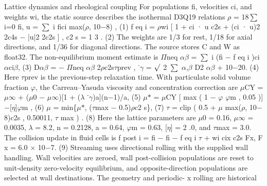 \documentclass[11pt]{article}
\begin{document}
Lattice dynamics and rheological coupling
For populations fi, velocities ci, and weights wi, the static source describes the isothermal D3Q19
relations
\ensuremath{\rho} =
18\ensuremath{\sum}
i=0
fi, u =
\ensuremath{\sum}
i fici
max(\ensuremath{\rho}, 10\ensuremath{-}8) , (1)
f eq
i = \ensuremath{\rho}wi
[
1 + ci · u
c2s
+ (ci · u)2
2c4s
\ensuremath{-} |u|2
2c2s
]
, c2
s = 1
3 . (2)
The weights are 1/3 for rest, 1/18 for axial directions, and 1/36 for diagonal directions. The source
stores C and W as float32. The non-equilibrium moment estimate is
\ensuremath{\Pi}neq
\ensuremath{\alpha}\ensuremath{\beta} =
\ensuremath{\sum}
i
(fi \ensuremath{-} f eq
i )ci\ensuremath{\alpha}ci\ensuremath{\beta}, (3)
D\ensuremath{\alpha}\ensuremath{\beta} = \ensuremath{-}
\ensuremath{\Pi}neq
\ensuremath{\alpha}\ensuremath{\beta}
2\ensuremath{\rho}c2s\ensuremath{\tau}prev
, ˙\ensuremath{\gamma} =
\ensuremath{\surd}
2
\ensuremath{\sum}
\ensuremath{\alpha},\ensuremath{\beta}
D2
\ensuremath{\alpha}\ensuremath{\beta} + 10\ensuremath{-}20. (4)
Here \ensuremath{\tau}prev is the previous-step relaxation time. With particulate solid volume fraction \ensuremath{\varphi}, the
Carreau–Yasuda viscosity and concentration correction are
\ensuremath{\mu}CY = \ensuremath{\mu}\ensuremath{\infty} + (\ensuremath{\mu}0 \ensuremath{-} \ensuremath{\mu}\ensuremath{\infty})[1 + (\ensuremath{\lambda} ˙\ensuremath{\gamma})a](n\ensuremath{-}1)/a, (5)
\ensuremath{\mu}\ensuremath{\ast} = \ensuremath{\mu}CY
[
max
(
1 \ensuremath{-} \ensuremath{\varphi}
\ensuremath{\varphi}m
, 0.05
)] \ensuremath{-}[\ensuremath{\eta}]\ensuremath{\varphi}m
, (6)
\ensuremath{\mu} = min\{\ensuremath{\mu}\ensuremath{\ast}, (\ensuremath{\tau}max \ensuremath{-} 0.5)\ensuremath{\rho}c2
s\}, (7)
\ensuremath{\tau} = clip
(
0.5 + \ensuremath{\mu}
max(\ensuremath{\rho}, 10\ensuremath{-}8)c2s
, 0.50011, \ensuremath{\tau} max
)
. (8)
Here the lattice parameters are \ensuremath{\mu}0 = 0.16, \ensuremath{\mu}\ensuremath{\infty} = 0.0035, \ensuremath{\lambda} = 8.2, n = 0.2128, a = 0.64, \ensuremath{\varphi}m = 0.63,
[\ensuremath{\eta}] = 2 .0, and \ensuremath{\tau}max = 3.0. The collision update in fluid cells is
f post
i = fi \ensuremath{-} fi \ensuremath{-} f eq
i
\ensuremath{\tau} + wi
cix
c2s
Fx, F x = 6.0 \ensuremath{\times} 10\ensuremath{-}7. (9)
Streaming uses directional rolling with the supplied wall handling. Wall velocities are zeroed, wall
post-collision populations are reset to unit-density zero-velocity equilibrium, and opposite-direction
populations are selected at wall destinations. The geometry and periodic- x rolling are historical
\end{document}
